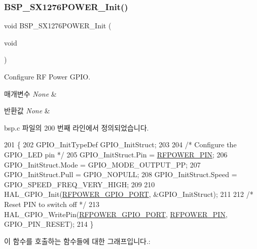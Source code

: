 \subsubsection{\texorpdfstring{B\+S\+P\+\_\+\+S\+X1276\+P\+O\+W\+E\+R\+\_\+\+Init()}{BSP\_SX1276POWER\_Init()}}
{\footnotesize\ttfamily void B\+S\+P\+\_\+\+S\+X1276\+P\+O\+W\+E\+R\+\_\+\+Init (\begin{DoxyParamCaption}\item[{void}]{ }\end{DoxyParamCaption})}



Configure RF Power G\+P\+IO. 


\begin{DoxyParams}{매개변수}
{\em None} & \\
\hline
\end{DoxyParams}

\begin{DoxyRetVals}{반환값}
{\em None} & \\
\hline
\end{DoxyRetVals}


bsp.\+c 파일의 200 번째 라인에서 정의되었습니다.


\begin{DoxyCode}
201 \{
202   GPIO\_InitTypeDef  GPIO\_InitStruct;
203   
204   \textcolor{comment}{/* Configure the GPIO\_LED pin */}
205     GPIO\_InitStruct.Pin = \mbox{\hyperlink{_lory_s_d_k__hw__conf_8h_a15fab54516f17b1b5a79b1fbfc397d79}{RFPOWER\_PIN}};
206     GPIO\_InitStruct.Mode = GPIO\_MODE\_OUTPUT\_PP;
207     GPIO\_InitStruct.Pull = GPIO\_NOPULL;
208     GPIO\_InitStruct.Speed = GPIO\_SPEED\_FREQ\_VERY\_HIGH;
209   
210     HAL\_GPIO\_Init(\mbox{\hyperlink{_lory_s_d_k__hw__conf_8h_a8f8e11c368ec33b36ed1ba4d84bdc555}{RFPOWER\_GPIO\_PORT}}, &GPIO\_InitStruct);        
211 
212   \textcolor{comment}{/* Reset PIN to switch off */}
213     HAL\_GPIO\_WritePin(\mbox{\hyperlink{_lory_s_d_k__hw__conf_8h_a8f8e11c368ec33b36ed1ba4d84bdc555}{RFPOWER\_GPIO\_PORT}}, \mbox{\hyperlink{_lory_s_d_k__hw__conf_8h_a15fab54516f17b1b5a79b1fbfc397d79}{RFPOWER\_PIN}}, GPIO\_PIN\_RESET);
214 \}
\end{DoxyCode}
이 함수를 호출하는 함수들에 대한 그래프입니다.\+:
\mbox{\label{group___docking_station___r_f___power___functions_ga0514aa0607414fb41ea7e37a58ce6307}} 
